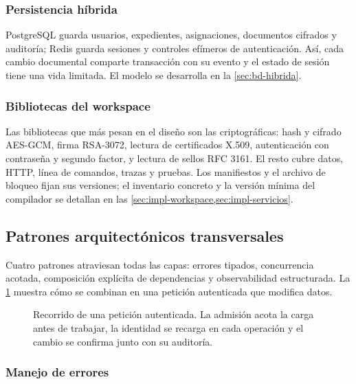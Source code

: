 \subsubsection{Persistencia híbrida}\label{sec:persistencia-hibrida}

PostgreSQL guarda usuarios, expedientes, asignaciones, documentos cifrados y auditoría; Redis guarda sesiones y controles efímeros de autenticación. Así, cada cambio documental comparte transacción con su evento y el estado de sesión tiene una vida limitada. El modelo se desarrolla en la \cref{sec:bd-hibrida}.

\subsubsection{Bibliotecas del workspace}\label{sec:inventario-crates}

Las bibliotecas que más pesan en el diseño son las criptográficas: hash y cifrado AES-GCM, firma RSA-3072, lectura de certificados X.509, autenticación con contraseña y segundo factor, y lectura de sellos RFC 3161. El resto cubre datos, HTTP, línea de comandos, trazas y pruebas. Los manifiestos y el archivo de bloqueo fijan sus versiones; el inventario concreto y la versión mínima del compilador se detallan en las \cref{sec:impl-workspace,sec:impl-servicios}.

\subsection{Patrones arquitectónicos transversales}\label{sec:patrones-transversales}

Cuatro patrones atraviesan todas las capas: errores tipados, concurrencia acotada, composición explícita de dependencias y observabilidad estructurada. La \cref{fig:peticion} muestra cómo se combinan en una petición autenticada que modifica datos.

\begin{figure}[!htbp]
  \centering
  
  \caption{Recorrido de una petición autenticada. La admisión acota la carga antes de trabajar, la identidad se recarga en cada operación y el cambio se confirma junto con su auditoría.}
  \label{fig:peticion}
\end{figure}

\subsubsection{Manejo de errores}\label{sec:manejo-errores}

